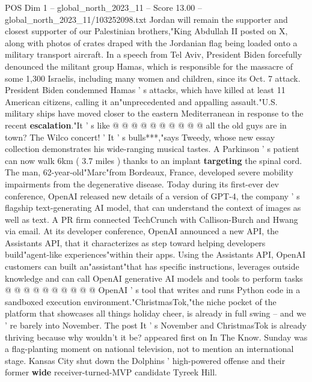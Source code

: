 \begin{textsample}{POS Dim 1 – global\_north\_2023\_11 – Score 13.00 – global\_north\_2023\_11/103252098.txt}
Jordan will remain the supporter and closest supporter of our Palestinian brothers,"King Abdullah II posted on X, along with photos of crates draped with the Jordanian flag being loaded onto a military transport aircraft.
In a speech from Tel Aviv, President Biden forcefully denounced the militant group Hamas, which is responsible for the massacre of some 1,300 Israelis, including many women and children, since its Oct. 7 attack.
President Biden condemned Hamas ' s attacks, which have killed at least 11 American citizens, calling it an"unprecedented and appalling assault."U.S. military ships have moved closer to the eastern Mediterranean in response to the recent \textbf{escalation}."It ' s like @ @ @ @ @ @ @ @ @ @ all the old guys are in town?
The Wilco concert! ' It ' s bulls***,"says Tweedy, whose new essay collection demonstrates his wide-ranging musical tastes.
A Parkinson ' s patient can now walk 6km ( 3.7 miles ) thanks to an implant \textbf{targeting} the spinal cord.
The man, 62-year-old"Marc"from Bordeaux, France, developed severe mobility impairments from the degenerative disease.
Today during its first-ever dev conference, OpenAI released new details of a version of GPT-4, the company ' s flagship text-generating AI model, that can understand the context of images as well as text.
A PR firm connected TechCrunch with Callison-Burch and Hwang via email.
At its developer conference, OpenAI announced a new API, the Assistants API, that it characterizes as step toward helping developers build"agent-like experiences"within their apps.
Using the Assistants API, OpenAI customers can built an"assistant"that has specific instructions, leverages outside knowledge and can call OpenAI generative AI models and tools to perform tasks @ @ @ @ @ @ @ @ @ @ OpenAI ' s tool that writes and runs Python code in a sandboxed execution environment."ChristmasTok,"the niche pocket of the platform that showcases all things holiday cheer, is already in full swing -- and we ' re barely into November.
The post It ' s November and ChristmasTok is already thriving because why wouldn't it be? appeared first on In The Know.
Sunday was a flag-planting moment on national television, not to mention an international stage.
Kansas City shut down the Dolphins ' high-powered offense and their former \textbf{wide} receiver-turned-MVP candidate Tyreek Hill.

\end{textsample}
